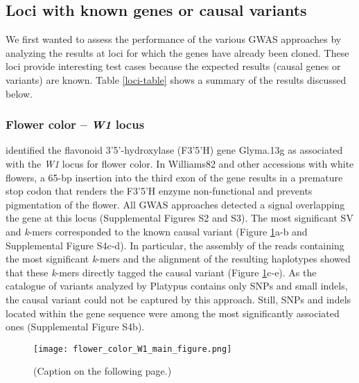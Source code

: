 \documentclass{article}
\begin{document}
\subsection*{Loci with known genes or causal variants}

We first wanted to assess the performance of the various GWAS
approaches by analyzing the results at loci for which the genes have
already been cloned. These loci provide interesting test cases because
the expected results (causal genes or variants) are known. Table \ref{loci-table} shows
a summary of the results discussed below.

\subsubsection*{Flower color -- \textit{W1} locus}

 identified the flavonoid 3’5’-hydroxylase (F3’5’H) gene
Glyma.13g as associated with the \textit{W1} locus for flower color. In
Williams82 and other accessions with white flowers, a 65-bp insertion into the
third exon of the gene results in a premature stop codon that renders the
F3’5’H enzyme non-functional and prevents pigmentation of the flower. All
GWAS approaches detected a signal overlapping the gene at this locus (Supplemental Figures
S2 and S3). The most
significant SV and \textit{k}-mers corresponded to the known causal variant
(Figure \ref{flower-color-main-figure}a-b and Supplemental Figure S4c-d).
In particular, the assembly of the reads containing the most significant \textit{k}-mers
and the alignment of the resulting haplotypes showed that these \textit{k}-mers
directly tagged the causal variant (Figure \ref{flower-color-main-figure}c-e).
As the catalogue of variants analyzed by Platypus contains only SNPs and small
indels, the causal variant could not be captured by this approach. Still, SNPs
and indels located within the gene sequence were among the most significantly
associated ones (Supplemental Figure S4b).

\begin{figure}
	\centering
	\texttt{[image: flower\_color\_W1\_main\_figure.png]}
	\caption{(Caption on the following page.)}
	\label{flower-color-main-figure}
\end{figure}
\end{document}
